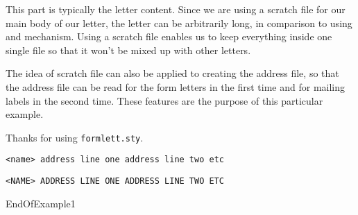 {{{{This part is typically the letter content. Since we are using a
scratch file for our main body of our letter, the letter can be
arbitrarily long, in comparison to using {\tt \string\beginletter}
and {\tt \string\endletter} mechanism. Using a scratch file enables
us to keep everything inside one single file so that it won't be mixed
up with other letters.

\medskip

The idea of scratch file can also be applied to creating the address
file, so that the address file can be read for the form letters in the
first time and for mailing labels in the second time. These features are
the purpose of this particular example.

\medskip
Thanks for using {\tt formlett.sty}.

}}}  %
\vfill\eject

\endfile


%
%
\beginlinemode
\tt<name>
address line one
address line two
etc

\tt<NAME>
ADDRESS LINE ONE
ADDRESS LINE TWO
ETC

\endlinemode
\endfile


%
%

\hsize=5in
\initstyle{}{}

\beginlabels
{}  %
\endlabels



EndOfExample1






%

%



\hsize=3.2in  %
\initstyle[]{}{\textwidth=3.2in}  %

}
